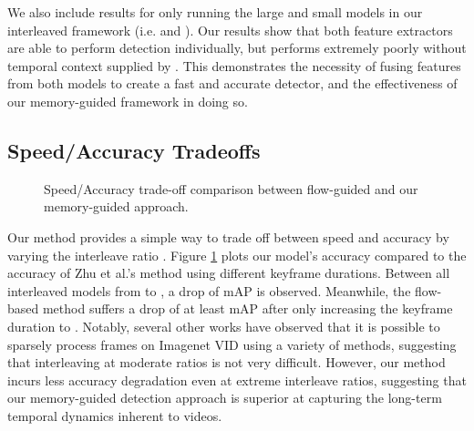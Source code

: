 \documentclass[10pt,twocolumn,letterpaper]{article}
\begin{document}
We also include results for only running the large and small models in our interleaved framework (i.e.  and ). Our results show that both feature extractors are able to perform detection individually, but  performs extremely poorly without temporal context supplied by . This demonstrates the necessity of fusing features from both models to create a fast and accurate detector, and the effectiveness of our memory-guided framework in doing so.


\subsection{Speed/Accuracy Tradeoffs}
\begin{figure}[t]
\centering
{}
\centering
\vspace{-.5em}
\caption{Speed/Accuracy trade-off comparison between flow-guided and our memory-guided approach.}
\label{fig:ratio}
\end{figure}

Our method provides a simple way to trade off between speed and accuracy by varying the interleave ratio . Figure \ref{fig:ratio} plots our model's accuracy compared to the accuracy of Zhu et al.'s method using different keyframe durations. Between all interleaved models from  to , a drop of  mAP is observed. Meanwhile, the flow-based method suffers a drop of at least  mAP after only increasing the keyframe duration to . Notably, several other works \cite{feichtenhofer2017detect, chen2018optimizing} have observed that it is possible to sparsely process frames on Imagenet VID using a variety of methods, suggesting that interleaving at moderate ratios is not very difficult. However, our method incurs less accuracy degradation even at extreme interleave ratios, suggesting that our memory-guided detection approach is superior at capturing the long-term temporal dynamics inherent to videos.
\end{document}
